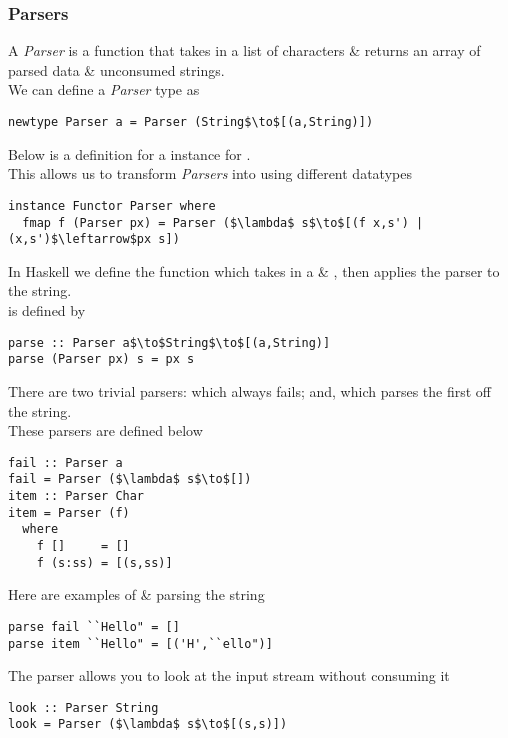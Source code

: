 \documentclass[11pt,a4paper]{article}
\begin{document}
\subsubsection{Parsers}

A \textit{Parser} is a function that takes in a list of characters \& returns an array of parsed data \& unconsumed strings.\\
We can define a \textit{Parser} type as
\begin{lstlisting}
newtype Parser a = Parser (String$\to$[(a,String)])
\end{lstlisting}

Below is a definition for a {} instance for {}.\\
This allows us to transform \textit{Parsers} into using different datatypes
\begin{lstlisting}
instance Functor Parser where
  fmap f (Parser px) = Parser ($\lambda$ s$\to$[(f x,s') | (x,s')$\leftarrow$px s])
\end{lstlisting}

In Haskell we define the function {} which takes in a {}\& {}, then applies the parser to the string.\\
{} is defined by
\begin{lstlisting}
parse :: Parser a$\to$String$\to$[(a,String)]
parse (Parser px) s = px s
\end{lstlisting}

There are two trivial parsers: {}which always fails; and, {} which parses the first {} off the string.\\
These parsers are defined below
\begin{lstlisting}
fail :: Parser a
fail = Parser ($\lambda$ s$\to$[])
item :: Parser Char
item = Parser (f)
  where
    f []     = []
    f (s:ss) = [(s,ss)]
\end{lstlisting}

Here are examples of {} \& {} parsing the string {}
\begin{lstlisting}
parse fail ``Hello" = []
parse item ``Hello" = [('H',``ello")]
\end{lstlisting}

The {} parser allows you to look at the input stream without consuming it
\begin{lstlisting}
look :: Parser String
look = Parser ($\lambda$ s$\to$[(s,s)])
\end{lstlisting}
\end{document}
